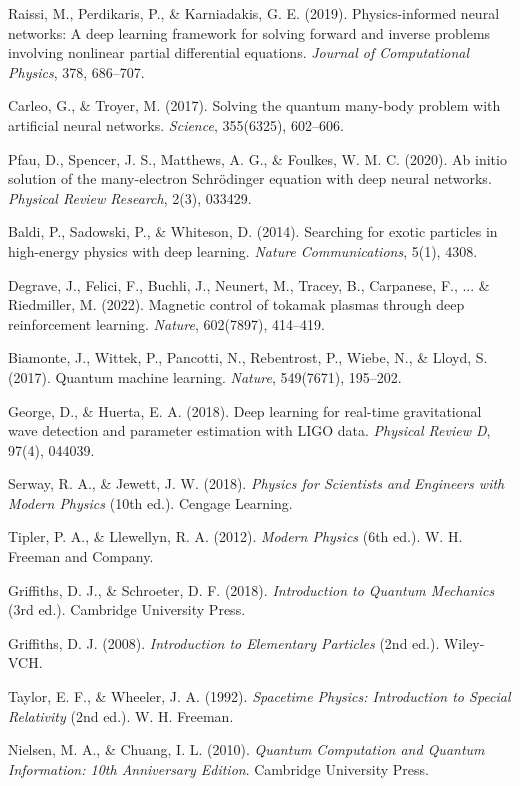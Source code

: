 \begin{enumerate}[label={[\arabic*]}, leftmargin=2.5em, itemsep=7pt]
    \item Raissi, M., Perdikaris, P., \& Karniadakis, G. E. (2019). Physics-informed neural networks: A deep learning framework for solving forward and inverse problems involving nonlinear partial differential equations. \textit{Journal of Computational Physics}, 378, 686--707.
    \item Carleo, G., \& Troyer, M. (2017). Solving the quantum many-body problem with artificial neural networks. \textit{Science}, 355(6325), 602--606.
    \item Pfau, D., Spencer, J. S., Matthews, A. G., \& Foulkes, W. M. C. (2020). Ab initio solution of the many-electron Schrödinger equation with deep neural networks. \textit{Physical Review Research}, 2(3), 033429.
    \item Baldi, P., Sadowski, P., \& Whiteson, D. (2014). Searching for exotic particles in high-energy physics with deep learning. \textit{Nature Communications}, 5(1), 4308.
    \item Degrave, J., Felici, F., Buchli, J., Neunert, M., Tracey, B., Carpanese, F., ... \& Riedmiller, M. (2022). Magnetic control of tokamak plasmas through deep reinforcement learning. \textit{Nature}, 602(7897), 414--419.
    \item Biamonte, J., Wittek, P., Pancotti, N., Rebentrost, P., Wiebe, N., \& Lloyd, S. (2017). Quantum machine learning. \textit{Nature}, 549(7671), 195--202.
    \item George, D., \& Huerta, E. A. (2018). Deep learning for real-time gravitational wave detection and parameter estimation with LIGO data. \textit{Physical Review D}, 97(4), 044039.
    \item Serway, R. A., \& Jewett, J. W. (2018). \textit{Physics for Scientists and Engineers with Modern Physics} (10th ed.). Cengage Learning.
    \item Tipler, P. A., \& Llewellyn, R. A. (2012). \textit{Modern Physics} (6th ed.). W. H. Freeman and Company.
    \item Griffiths, D. J., \& Schroeter, D. F. (2018). \textit{Introduction to Quantum Mechanics} (3rd ed.). Cambridge University Press.
    \item Griffiths, D. J. (2008). \textit{Introduction to Elementary Particles} (2nd ed.). Wiley-VCH.
    \item Taylor, E. F., \& Wheeler, J. A. (1992). \textit{Spacetime Physics: Introduction to Special Relativity} (2nd ed.). W. H. Freeman.
    \item Nielsen, M. A., \& Chuang, I. L. (2010). \textit{Quantum Computation and Quantum Information: 10th Anniversary Edition}. Cambridge University Press.

\end{enumerate}
